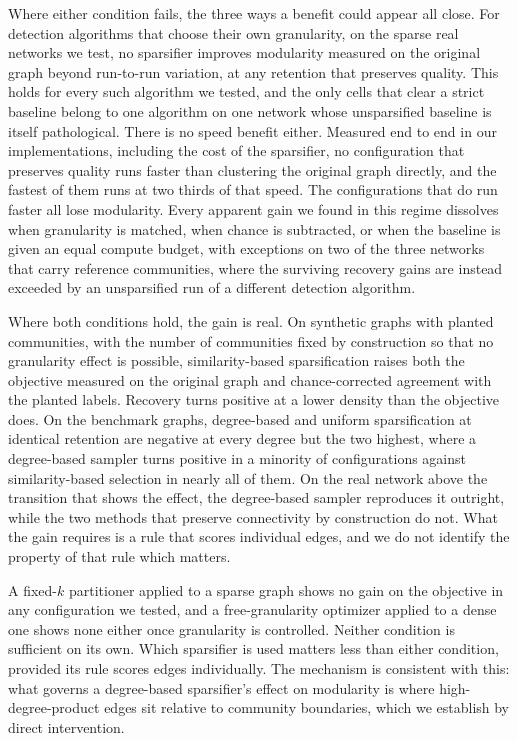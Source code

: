 Where either condition fails, the three ways a benefit could appear all close.
For detection
algorithms that choose their own granularity, on the sparse real networks we
test, no sparsifier improves modularity measured on the original graph beyond
run-to-run variation, at any retention that preserves quality. This holds for
every such algorithm we tested, and the only cells that clear a strict baseline
belong to one algorithm on one network whose unsparsified baseline is itself
pathological. There is no speed benefit either. Measured end to end in our
implementations, including the cost of the sparsifier, no configuration that
preserves quality runs faster than clustering the original graph directly, and
the fastest of them runs at two thirds of that speed. The configurations that do
run faster all lose modularity. Every apparent gain we found in this regime dissolves when granularity is
matched, when chance is subtracted, or when the baseline is given an equal
compute budget, with exceptions on two of the three networks that carry reference
communities, where the surviving recovery gains are instead exceeded by an
unsparsified run of a different detection algorithm.

Where both conditions hold, the gain is real. On synthetic graphs with planted
communities, with the number of communities fixed by construction so that no
granularity effect is possible, similarity-based sparsification raises both the
objective measured on the original graph and chance-corrected agreement with the
planted labels. Recovery turns positive at a lower density than the objective
does. On the benchmark graphs, degree-based and uniform sparsification at
identical retention are negative at every degree but the two highest, where a
degree-based sampler turns positive in a minority of configurations against
similarity-based selection in nearly all of them. On the real network above the
transition that shows the effect, the degree-based sampler reproduces it
outright, while the two methods that preserve connectivity by construction do
not. What the gain requires is a rule that scores
individual edges, and we do not identify the property of that rule which matters.

A fixed-$k$ partitioner applied to a sparse graph shows no gain on the objective
in any configuration we tested, and a free-granularity optimizer applied to a
dense one shows none either once granularity is controlled. Neither condition is
sufficient on its own. Which sparsifier is used matters less than either
condition, provided its rule scores edges individually. The mechanism is
consistent with this: what governs a degree-based
sparsifier's effect on modularity is where high-degree-product edges sit relative
to community boundaries, which we establish by direct intervention.

